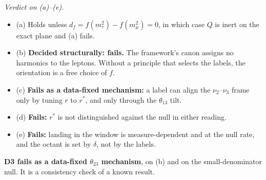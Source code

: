 \emph{Verdict on (a)--(e).}
\begin{itemize}
\item (a) Holds unless $d_f=f(m_\tau^2)-f(m_\mu^2)=0$, in which case $Q$ is inert on the exact plane and (a) fails.
\item (b) \textbf{Decided structurally: fails.} The framework's canon assigns no harmonics to the
  leptons. Without a principle that selects the labels, the orientation is a free choice of $f$.
\item (c) \textbf{Fails as a data-fixed mechanism:} a label can align the $\nu_2$--$\nu_3$ frame
  only by tuning $r$ to $r^*$, and only through the $\theta_{13}$ tilt.
\item (d) \textbf{Fails:} $r^*$ is not distinguished against the null in either reading.
\item (e) \textbf{Fails:} landing in the window is measure-dependent and at the null rate, and the
  octant is set by $\delta$, not by the labels.
\end{itemize}
\textbf{D3 fails as a data-fixed $\theta_{23}$ mechanism}, on (b) and on the small-denominator null.
It is a consistency check of a known result.

